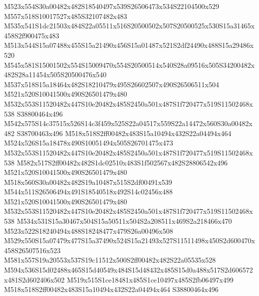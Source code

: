\documentclass{article}
\begin{document}
\begin{multicols}{2}

M523x554S30a00482x482S18540497x539S26506473x534S22104500x529 M557x518S10017527x485S32107482x483 M535x541S1dc21503x484S22a05511x516S20500502x507S20500525x530S15a31465x458S2f900475x483 M513x544S15a07488x455S15a21490x456S15a01487x521S2df24490x488S15a29486x520 M545x581S15001502x554S15009470x554S20500514x540S28a09516x505S34200482x482S28a11454x505S20500476x540 M537x518S15a18464x482S18210479x495S26602507x490S26506511x504 M521x520S10041500x490S26501479x480 M532x553S11520482x447S10e20482x485S2450a501x487S1f720477x519S11502468x538 S38800464x496 M542x575S14c37515x526S14c3f459x525S22a04517x559S22a14472x560S30a00482x482 S38700463x496 M518x518S2ff00482x483S15a10494x432S22a04494x464 M524x526S15a18478x490S10051494x505S26701475x473 M532x553S11520482x447S10e20482x485S2450a501x487S1f720477x519S11502468x538 M582x517S2ff00482x482S1dc02510x483S1f502567x482S28806542x496 M521x520S10041500x490S26501479x480 M518x560S30a00482x482S19a10487x515S2df00491x539 M544x511S26506494x491S18540518x492S14c02456x488 M521x520S10041500x490S26501479x480 M532x553S11520482x447S10e20482x485S2450a501x487S1f720477x519S11502468x538 M534x531S15a30467x504S15a50511x504S2a208511x469S2a218466x470 M523x522S18240494x488S18248477x479S26a00496x508 M529x550S15a07479x477S15a37490x524S15a21493x527S11511498x450S2d600470x458S26507516x523 M581x557S19a20553x537S19c11512x500S2ff00482x482S22a05535x528 M594x536S15d02488x465S15d40549x484S15d48432x485S15d0a488x517S2d606572x481S2d602406x502 M519x515S1ce18481x485S1ce10497x485S2fb06497x499 M518x518S2ff00482x483S15a10494x432S22a04494x464 S38800464x496






\end{multicols}
\end{document}
